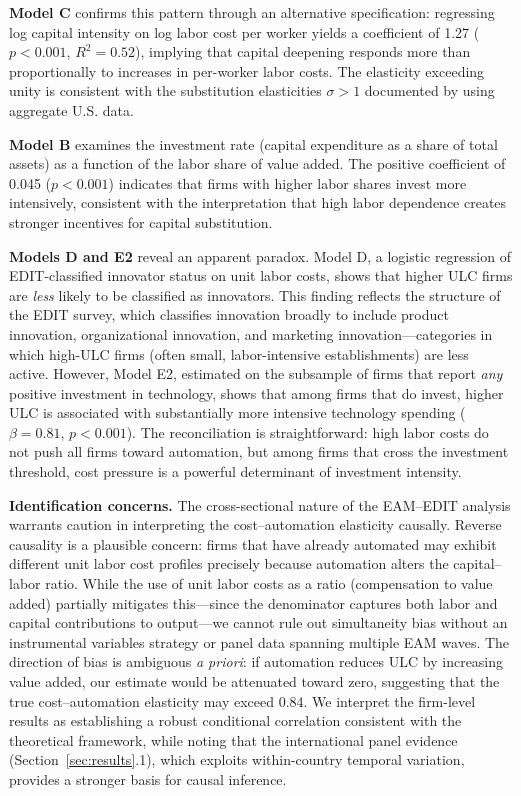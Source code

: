 \documentclass{article}
\begin{document}
\textbf{Model C} confirms this pattern through an alternative specification: regressing log capital intensity on log labor cost per worker yields a coefficient of 1.27 ($p < 0.001$, $R^2 = 0.52$), implying that capital deepening responds more than proportionally to increases in per-worker labor costs. The elasticity exceeding unity is consistent with the substitution elasticities $\sigma > 1$ documented by \cite{cheng2021elasticity} using aggregate U.S. data.

\textbf{Model B} examines the investment rate (capital expenditure as a share of total assets) as a function of the labor share of value added. The positive coefficient of 0.045 ($p < 0.001$) indicates that firms with higher labor shares invest more intensively, consistent with the interpretation that high labor dependence creates stronger incentives for capital substitution.

\textbf{Models D and E2} reveal an apparent paradox. Model D, a logistic regression of EDIT-classified innovator status on unit labor costs, shows that higher ULC firms are \textit{less} likely to be classified as innovators. This finding reflects the structure of the EDIT survey, which classifies innovation broadly to include product innovation, organizational innovation, and marketing innovation---categories in which high-ULC firms (often small, labor-intensive establishments) are less active. However, Model E2, estimated on the subsample of firms that report \textit{any} positive investment in technology, shows that among firms that do invest, higher ULC is associated with substantially more intensive technology spending ($\beta = 0.81$, $p < 0.001$). The reconciliation is straightforward: high labor costs do not push all firms toward automation, but among firms that cross the investment threshold, cost pressure is a powerful determinant of investment intensity.

\textbf{Identification concerns.} The cross-sectional nature of the EAM--EDIT analysis warrants caution in interpreting the cost--automation elasticity causally. Reverse causality is a plausible concern: firms that have already automated may exhibit different unit labor cost profiles precisely because automation alters the capital--labor ratio. While the use of unit labor costs as a ratio (compensation to value added) partially mitigates this---since the denominator captures both labor and capital contributions to output---we cannot rule out simultaneity bias without an instrumental variables strategy or panel data spanning multiple EAM waves. The direction of bias is ambiguous \textit{a priori}: if automation reduces ULC by increasing value added, our estimate would be attenuated toward zero, suggesting that the true cost--automation elasticity may exceed 0.84. We interpret the firm-level results as establishing a robust conditional correlation consistent with the theoretical framework, while noting that the international panel evidence (Section~\ref{sec:results}.1), which exploits within-country temporal variation, provides a stronger basis for causal inference.
\end{document}
